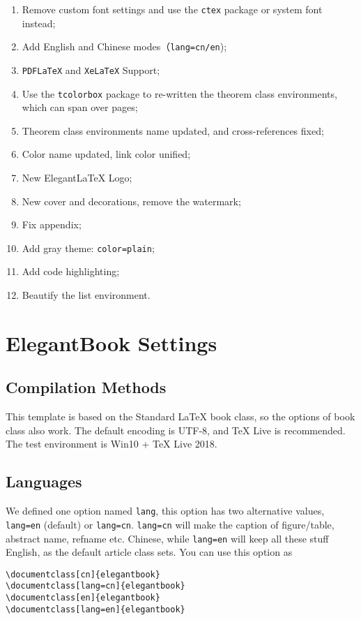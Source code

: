 \documentclass[noanswer,fancy,blue,11pt]{elegantbook}
\begin{document}
\begin{enumerate}
   \item Remove custom font settings and use the \lstinline{ctex} package or system font instead;
   \item Add English and Chinese modes（\lstinline{lang=cn/en});
   \item \lstinline{PDFLaTeX} and \lstinline{XeLaTeX} Support;
   \item Use the \lstinline{tcolorbox} package to re-written the theorem class environments, which can span over pages;
   \item Theorem class environments name updated, and cross-references fixed;
   \item Color name updated, link color unified;
   \item New Elegant\LaTeX{} Logo;
   \item New cover and decorations, remove the watermark;
   \item Fix appendix;
   \item Add gray theme: \lstinline{color=plain};
   \item Add code highlighting;
   \item Beautify the list environment.
\end{enumerate}


\chapter{ElegantBook Settings}


\section{Compilation Methods}
This template is based on the Standard LaTeX book class,  so the options of book class also work. The default encoding is UTF-8, and \TeX{} Live is recommended. The test environment is Win10 + \TeX{} Live 2018. 


\section{Languages}

We defined one option named \lstinline{lang}, this option has two alternative values, \lstinline{lang=en} (default) or \lstinline{lang=cn}. \lstinline{lang=cn} will make the caption of figure/table, abstract name, refname etc. Chinese, while \lstinline{lang=en} will keep all these stuff English, as the default article class sets. You can use this option as
\begin{lstlisting}
\documentclass[cn]{elegantbook} 
\documentclass[lang=cn]{elegantbook}
\documentclass[en]{elegantbook} 
\documentclass[lang=en]{elegantbook}
\end{lstlisting}
\end{document}
